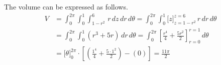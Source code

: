 \documentclass[a4paper, 12pt]{article}
\begin{document}
\begin{enumerate}[leftmargin=*,label=\textbf{\arabic*.}]
\begin{enumerate}[leftmargin=*,label=\textbf{\alph*.}]
The volume can be expressed as follows.
\begin{align*}
    V&=\int_0^{2\pi}\int_0^1\int_{1-r^2}^{6}\,r\,dz\,dr\,d\theta=\int_0^{2\pi}\int_0^1\big[z\big]_{z=1-r^2}^{z=6}\,r\,dr\,d\theta\\[1em]&=\int_0^{2\pi}\int_0^1\left(r^3+5r\right)\,dr\,d\theta=\int_0^{2\pi}\left[\frac{r^4}{4} + \frac{5r^2}{2}\right]_{r=0}^{r=1}\,d\theta\\[1em]&=\big[\theta\big]_0^{2\pi}\cdot\left[ \left(\frac{1^4}4 + \frac{5\cdot1^2}2\right)-\left(0\right)\right]=\boxed{\frac{11\pi}2}
\end{align*}

\end{enumerate}
\end{enumerate}

\newpage
{}
{}


\end{document}
